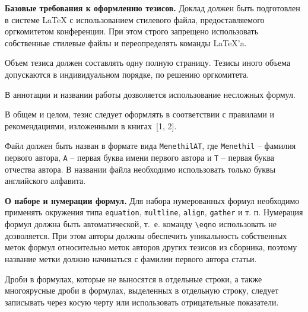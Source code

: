 \documentclass[
	openany, %
	11pt, %
	a4paper, %
]{book} %
\begin{document}

\noindent{}

\bigskip

\textbf{Базовые требования к оформлению тезисов.} Доклад должен быть подготовлен в системе \LaTeX{} с использованием стилевого файла, предоставляемого оргкомитетом конференции. При этом строго запрещено использовать собственные стилевые файлы и переопределять команды \LaTeX'a.

Объем тезиса должен составлять одну полную страницу. Тезисы иного объема допускаются в индивидуальном порядке, по решению оргкомитета.

В аннотации и названии работы дозволяется использование несложных формул.

В общем и целом, тезис следует оформлять в соответствии с правилами и рекомендациями, изложенными в книгах~[1, 2].

Файл должен быть назван в формате вида \verb|MenethilAT|, где \verb|Menethil| -- фамилия первого автора, \verb|A| -- первая буква имени первого автора и \verb|T| -- первая буква отчества автора. В названии файла необходимо использовать только буквы английского алфавита.

\textbf{О наборе и нумерации формул.} Для набора нумерованных формул необходимо применять окружения типа \verb|equation|, \verb|multline|, \verb|align|, \verb|gather| и т. п. Нумерация формул должна быть автоматической, т.~е. команду \verb|\eqno| использовать не дозволяется. При этом авторы должны обеспечить уникальность собственных меток формул относительно меток авторов других тезисов из сборника, поэтому название метки должно начинаться с фамилии первого автора статьи.

Дроби в формулах, которые не выносятся в отдельные строки, а также многоярусные дроби в формулах, выделенных в отдельную строку, следует записывать через косую черту или использовать отрицательные показатели.
\end{document}
